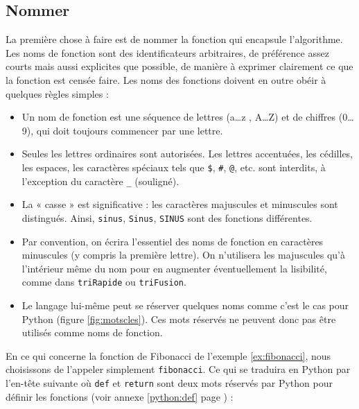 \subsection{Nommer}\label{sub:nommer}
La première chose à faire est de nommer la fonction qui encapsule l'algorithme. 
Les noms de fonction sont des identificateurs arbitraires, de préférence 
assez courts mais aussi explicites que possible, de manière à exprimer 
clairement ce que la fonction est censée faire. 
Les noms des fonctions doivent en outre obéir à quelques règles simples :
\begin{itemize}
\item Un nom de fonction est une séquence de lettres (a\ldots  z , A\ldots  Z) 
	et de chiffres (0\ldots  9), qui
      	doit toujours commencer par une lettre.
\item Seules les lettres ordinaires sont autorisées. Les lettres accentuées, 
	les cédilles, les espaces, les
      	caractères spéciaux tels que {\tt \$}, {\tt \#}, {\tt @}, etc. sont interdits, 
      	à l'exception du caractère {\tt \_} (souligné).
\item La « casse » est significative : les caractères majuscules et minuscules 
	sont distingués. Ainsi,
      	{\tt sinus}, {\tt Sinus}, {\tt SINUS} sont des fonctions différentes. 
\item Par convention, on écrira l'essentiel des noms de fonction en caractères minuscules (y compris la
	première lettre). On n'utilisera les majuscules qu'à l'intérieur même du nom  
	pour en augmenter éventuellement la lisibilité, comme dans {\tt triRapide} ou
	{\tt triFusion}.
\item Le langage lui-même peut se réserver quelques noms comme c'est le cas pour {\sc Python} 
	(figure \ref{fig:motscles}). Ces mots réservés ne peuvent donc pas être
	utilisés comme noms de fonction.
\end{itemize}
En ce qui concerne la fonction de Fibonacci de l'exemple \ref{ex:fibonacci}, 
nous choisissons de l'appeler simplement {\tt fibonacci}. Ce qui se traduira en {\sc Python} par
l'en-tête suivante où {\tt def} et {\tt return} sont deux mots réservés par {\sc Python}
pour définir les fonctions (voir annexe \ref{python:def} page \pageref{python:def}) :

